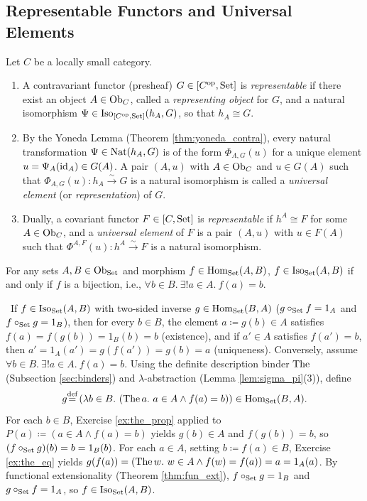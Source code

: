 \documentclass[10pt,a4paper]{article}
\begin{document}
\subsection{Representable Functors and Universal Elements}\label{sec:rep_functors}
\begin{definition}\label{def:representable}
Let $C$ be a locally small category.
\begin{enumerate}
\item A contravariant functor (presheaf) $G \in [C^{\textrm{op}}, {\textrm{Set}}]$ is \emph{representable} if there exist an object $A \in {\textrm{Ob}}_C$, called a \emph{representing object} for $G$, and a natural isomorphism $\Psi \in {\mathrm{Iso}}_{[C^{\textrm{op}}, {\textrm{Set}}]}(h_A, G)$, so that $h_A \cong G$.
\item By the Yoneda Lemma (Theorem \ref{thm:yoneda_contra}), every natural transformation $\Psi \in {\textrm{Nat}}(h_A, G)$ is of the form $\Phi_{A,G}(u)$ for a unique element $u = \Psi_A({\textrm{id}}_A) \in G(A)$. A pair $(A, u)$ with $A \in {\textrm{Ob}}_C$ and $u \in G(A)$ such that $\Phi_{A,G}(u) : h_A \xrightarrow{\sim} G$ is a natural isomorphism is called a \emph{universal element} (or \emph{representation}) of $G$.
\item Dually, a covariant functor $F \in [C, {\textrm{Set}}]$ is \emph{representable} if $h^A \cong F$ for some $A \in {\textrm{Ob}}_C$, and a \emph{universal element} of $F$ is a pair $(A, u)$ with $u \in F(A)$ such that $\Phi^{A,F}(u) : h^A \xrightarrow{\sim} F$ is a natural isomorphism.
\end{enumerate}
\end{definition}

\begin{lemma}\label{lem:set_iso_bij}
For any sets $A, B \in {\textrm{Ob}}_{\textrm{Set}}$ and morphism $f \in {\textrm{Hom}}_{\textrm{Set}}(A, B)$, $f \in {\mathrm{Iso}}_{\textrm{Set}}(A, B)$ if and only if $f$ is a bijection, i.e., $\forall b \in B.\ \exists !a \in A.\ f(a) = b$.
\end{lemma}
\myprf\ If $f \in {\mathrm{Iso}}_{\textrm{Set}}(A, B)$ with two-sided inverse $g \in {\textrm{Hom}}_{\textrm{Set}}(B, A)$ ($g \circ_{\textrm{Set}} f = 1_A$ and $f \circ_{\textrm{Set}} g = 1_B$), then for every $b \in B$, the element $a \coloneqq g(b) \in A$ satisfies $f(a) = f(g(b)) = 1_B(b) = b$ (existence), and if $a' \in A$ satisfies $f(a') = b$, then $a' = 1_A(a') = g(f(a')) = g(b) = a$ (uniqueness). Conversely, assume $\forall b \in B.\ \exists !a \in A.\ f(a) = b$. Using the definite description binder ${\textrm{The\,}}$ (Subsection \ref{sec:binders}) and $\lambda$-abstraction (Lemma \ref{lem:sigma_pi}(3)), define
$$g {\stackrel{{\textrm{def}}}{=}} \left(\lambda b \in B.\ ({\textrm{The\,}} a.\ a \in A \land f(a) = b)\right) \in {\textrm{Hom}}_{\textrm{Set}}(B, A).$$
For each $b \in B$, Exercise \ref{ex:the_prop} applied to $P(a) \coloneqq (a \in A \land f(a) = b)$ yields $g(b) \in A$ and $f(g(b)) = b$, so $(f \circ_{\textrm{Set}} g)(b) = b = 1_B(b)$. For each $a \in A$, setting $b \coloneqq f(a) \in B$, Exercise \ref{ex:the_eq} yields $g(f(a)) = ({\textrm{The\,}} w.\ w \in A \land f(w) = f(a)) = a = 1_A(a)$. By functional extensionality (Theorem \ref{thm:fun_ext}), $f \circ_{\textrm{Set}} g = 1_B$ and $g \circ_{\textrm{Set}} f = 1_A$, so $f \in {\mathrm{Iso}}_{\textrm{Set}}(A, B)$. \myqed
\end{document}
